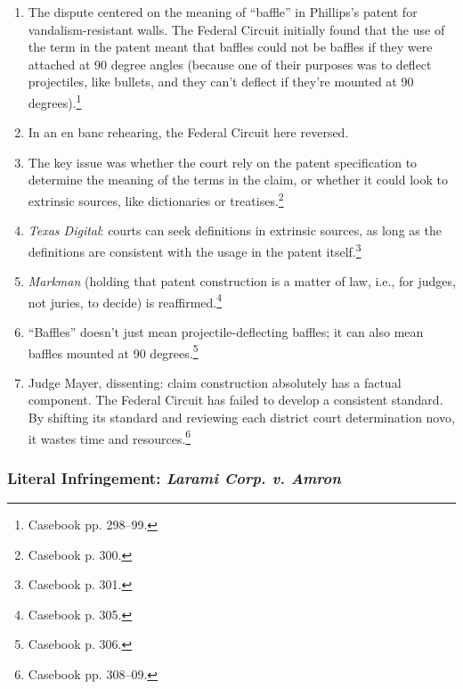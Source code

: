 \begin{enumerate}
    \item The dispute centered on the meaning of ``baffle'' in Phillips's 
    patent for vandalism-resistant walls. The Federal Circuit initially found 
    that the use of the term in the patent meant that baffles could not be 
    baffles if they were attached at 90 degree angles (because one of their 
    purposes was to deflect projectiles, like bullets, and they can't deflect if 
    they're mounted at 90 degrees).\footnote{Casebook pp. 298--99.}
    \item In an en banc rehearing, the Federal Circuit here reversed.
    \item The key issue was whether the court rely on the patent specification 
    to determine the meaning of the terms in the claim, or whether it could look 
    to extrinsic sources, like dictionaries or treatises.\footnote{Casebook p. 
    300.}
    \item \emph{Texas Digital}: courts can seek definitions in extrinsic 
    sources, as long as the definitions are consistent with the usage in the 
    patent itself.\footnote{Casebook p. 301.}
    \item \emph{Markman} (holding that patent construction is a matter of law, 
    i.e., for judges, not juries, to decide) is reaffirmed.\footnote{Casebook p. 
    305.}
    \item ``Baffles'' doesn't just mean projectile-deflecting baffles; it can 
    also mean baffles mounted at 90 degrees.\footnote{Casebook p. 306.}
    \item Judge Mayer, dissenting: claim construction absolutely has a factual 
    component. The Federal Circuit has failed to develop a consistent standard. 
    By shifting its standard and reviewing each district court determination 
    novo, it wastes time and resources.\footnote{Casebook pp. 308--09.}
\end{enumerate}

\subsubsection{Literal Infringement: \emph{Larami Corp. v. Amron}}


